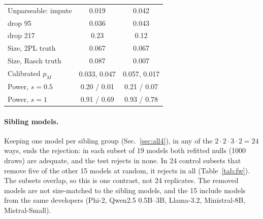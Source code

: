 \documentclass{article}
\theoremstyle{plain}
\theoremstyle{remark}
\begin{document}
\begin{table}[t]
\begin{small}
\begin{tabular}{@{}lcc@{}}
Unparseable: impute & 0.019 & 0.042 \\
\quad drop 95 & 0.036 & 0.043 \\
\quad drop 217 & 0.23 & 0.12 \\
Size, 2PL truth & 0.067 & 0.067 \\
Size, Rasch truth & 0.087 & 0.007 \\
Calibrated $p_M$ & 0.033, 0.047 & 0.057, 0.017 \\
Power, $s=0.5$ & 0.20 / 0.01 & 0.21 / 0.07 \\
Power, $s=1$ & 0.91 / 0.69 & 0.93 / 0.78 \\
\bottomrule
\end{tabular}
\end{small}
\vskip -0.1in
\end{table}

\paragraph{Sibling models.} Keeping one model per sibling group
(Sec.~\ref{sec:all4}), in any of the $2\cdot2\cdot3\cdot2=24$ ways,
ends the rejection: in each subset of 19 models both refitted nulls (1000 draws) are adequate, and the test rejects in none.
In 24 control subsets that remove five of the other 15
models at random, it rejects in all (Table~\ref{tab:fw}). The subsets overlap, so this is one contrast, not
24 replicates. The removed models are not size-matched to the sibling models, and the 15 include models from the same developers
(Phi-2, Qwen2.5 0.5B--3B, Llama-3.2, Ministral-8B, Mistral-Small).
\end{document}
